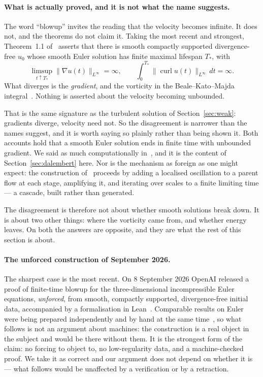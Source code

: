 \documentclass[11pt]{article}
\newcommand{\grad}{\nabla}
\begin{document}
\paragraph{What is actually proved, and it is not what the name suggests.} The word ``blowup''
invites the reading that the velocity becomes infinite. It does not, and the theorems do not claim
it. Taking the most recent and strongest, Theorem~1.1 of~\cite{openaieuler} asserts that there is
smooth compactly supported divergence-free $u_0$ whose smooth Euler solution has finite maximal
lifespan $T_*$, with
\[
\limsup_{t\uparrow T_*}\|\grad u(t)\|_{L^\infty}=\infty,
\qquad
\int_0^{T_*}\|\operatorname{curl}u(t)\|_{L^\infty}\,dt=\infty .
\]
What diverges is the \emph{gradient}, and the vorticity in the Beale--Kato--Majda
integral~\cite{bkm}. Nothing is asserted about the velocity becoming unbounded.

That is the same signature as the turbulent solution of Section~\ref{sec:weak}: gradients diverge,
velocity need not. So the disagreement is narrower than the names suggest, and it is worth saying so
plainly rather than being shown it. Both accounts hold that a smooth Euler solution ends in finite
time with unbounded gradient. We said as much computationally in~\cite{blowupHJ}, and it is the
content of Section~\ref{sec:dalembert} here. Nor is the mechanism as foreign as one might expect:
the construction of~\cite{openaieuler} proceeds by adding a localised oscillation to a parent flow
at each stage, amplifying it, and iterating over scales to a finite limiting time --- a cascade,
built rather than generated.

The disagreement is therefore not about whether smooth solutions break down. It is about two other
things: where the vorticity came from, and whether energy leaves. On both the answers are opposite,
and they are what the rest of this section is about.

\paragraph{The unforced construction of September 2026.} The sharpest case is the most recent. On
8 September 2026 OpenAI released a proof of finite-time blowup for the three-dimensional
incompressible Euler equations, \emph{unforced}, from smooth, compactly supported, divergence-free
initial data, accompanied by a formalisation in Lean~\cite{openaieuler}. Comparable results on Euler were being
prepared independently and by hand at the same time~\cite{buckmaster}, so what follows is not an
argument about machines: the construction is a real object in the subject and would be there without
them. It is the strongest form of
the claim: no forcing to object to, no low-regularity data, and a machine-checked proof. We take it
as correct and our argument does not depend on whether it is --- what follows would be unaffected by
a verification or by a retraction.
\end{document}
